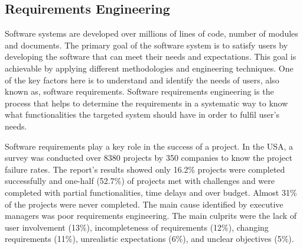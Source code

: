 \subsection{Requirements Engineering}

Software systems are developed over millions of lines of code, number of modules
and documents. The primary goal of the software system is to satisfy users by
developing the software that can meet their needs and expectations. This goal is
achievable by applying different methodologies and engineering techniques. One
of the key factors here is to understand and identify the needs of users, also
known as, software requirements. Software requirements engineering is the
process that helps to determine the requirements in a systematic way to know what
functionalities the targeted system should have in order to fulfil user's
needs.


Software requirements play a key role in the success of a project. In the USA, a
survey was conducted over 8380 projects by 350 companies to know the project
failure rates. The report's results \cite{StandishReport} showed only 16.2\%
projects were completed successfully and one-half (52.7\%) of projects met with challenges and
were completed with partial functionalities, time delays and over budget. Almost
31\% of the projects were never completed. The main cause identified by
executive managers was poor requirements engineering. The main culprits were the lack of
user involvement (13\%), incompleteness of requirements (12\%), changing
requirements (11\%), unrealistic expectations (6\%), and unclear objectives
(5\%). 

